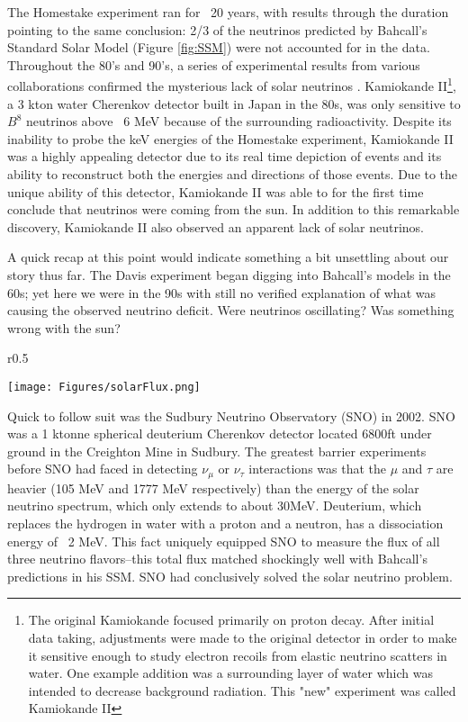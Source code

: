 \documentclass[12pt]{article}
\begin{document}
\par The Homestake experiment ran for ~20 years, with results through the duration pointing to the same conclusion: 2/3 of the neutrinos predicted by Bahcall's Standard Solar Model (Figure \ref{fig:SSM}) were not accounted for in the data\cite{ray0}.  Throughout the 80's and 90's, a series of experimental results from various collaborations confirmed the mysterious lack of solar neutrinos \cite{rayreview} \cite{kam0} \cite{sno}.  Kamiokande II\footnote{The original Kamiokande focused primarily on proton decay. After initial data taking, adjustments were made to the original detector in order to make it sensitive enough to study electron recoils from elastic neutrino scatters in water. One example addition was a surrounding layer of water which was intended to decrease background radiation.  This "new" experiment was called Kamiokande II}, a 3 kton water Cherenkov detector built in Japan in the 80s, was only sensitive to $B^8$ neutrinos above ~6 MeV\cite{kam0} because of the surrounding radioactivity. Despite its inability to probe the keV energies of the Homestake experiment, Kamiokande II was a highly appealing detector due to its real time depiction of events and its ability to reconstruct both the energies and directions of those events\cite{kam0}. Due to the unique ability of this detector, Kamiokande II was able to for the first time conclude that neutrinos were coming from the sun.  In addition to this remarkable discovery, Kamiokande II also observed an apparent lack of solar neutrinos.

\par A quick recap at this point would indicate something a bit unsettling about our story thus far. The Davis experiment began digging into Bahcall's models in the 60s; yet here we were in the 90s with still no verified explanation of what was causing the observed neutrino deficit.  Were neutrinos oscillating? Was something wrong with the sun\cite{Clarke}? 
\\ \begin{wrapfigure}{r}{0.5\textwidth}
\begin{center}
\captionsetup{justification=centering}
\texttt{[image: Figures/solarFlux.png]}
\end{center}
\caption{John Bahcall's Standard Solar Flux Model}
\label{fig:SSM}
\end{wrapfigure}

Quick to follow suit was the Sudbury Neutrino Observatory (SNO) in 2002.  SNO was a 1 ktonne spherical deuterium Cherenkov detector located 6800ft under ground in the Creighton Mine in Sudbury\cite{sno}. The greatest barrier experiments before SNO had faced in detecting $\nu_\mu$ or $\nu_\tau$ interactions was that the $\mu$ and $\tau$ are heavier (105 MeV and 1777 MeV respectively) than the energy of the solar neutrino spectrum, which only extends to about 30MeV. Deuterium, which replaces the hydrogen in water with a proton and a neutron, has a dissociation energy of ~2 MeV. This fact uniquely equipped SNO to measure the flux of all three neutrino flavors\cite{sno}--this total flux matched shockingly well with Bahcall's predictions in his SSM. SNO had conclusively solved the solar neutrino problem.  
\end{document}

